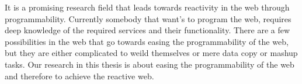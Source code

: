 
It is a promising research field that leads towards reactivity in the web through programmability.
Currently somebody that want's to program the web, requires deep knowledge of the required services and their functionality.
There are a few possibilities in the web that go towards easing the programmability of the web, but they are either complicated to weild themselves or mere data copy or mashup tasks.
Our research in this thesis is about easing the programmability of the web and therefore to achieve the reactive web. 
